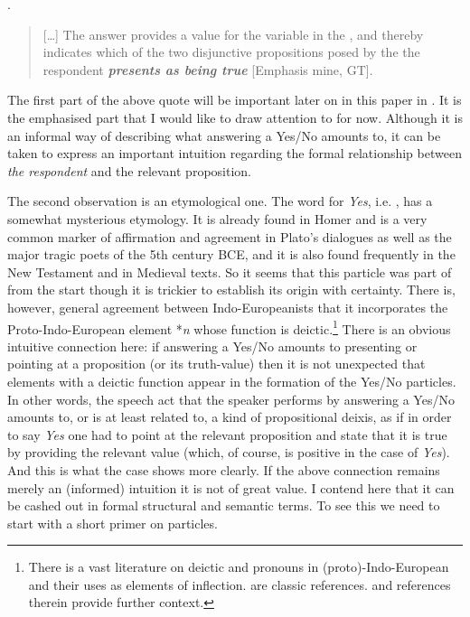 \documentclass[output=paper]{LSP/langsci}
\begin{document}
\Lsciex.
\begin{quote}
  [\ldots] The answer provides a value for the variable in the , and thereby indicates which of the two disjunctive propositions posed by the  the respondent \textit{\textbf{presents as being true}} [Emphasis mine, GT]. 
\end{quote}


The first part of the above quote will be important later on in this paper in .  It is the emphasised part that I would like to draw attention to for now.  Although it is an informal way of describing what answering a Yes/No  amounts to, it can be taken to express an important intuition regarding the formal relationship between \textit{the respondent} and the relevant proposition.

The second observation is an etymological one.  The  word for \textit{Yes}, i.e. \nai, has a somewhat mysterious etymology.  It is already found in Homer and is a very common marker of affirmation and agreement in Plato's dialogues as well as the major tragic poets of the 5th century BCE, and it is also found frequently in the New Testament and in Medieval texts.  So it seems that this particle was part of  from the start though it is trickier to establish its origin with certainty.  There is, however, general agreement between Indo-Europeanists that it incorporates the Proto-Indo-European element *\textit{n}  whose function is deictic.\footnote{There is a vast literature on deictic and  pronouns in (proto)-Indo-European and their uses as elements of inflection.  \citet{brugman:04,brugman:11} are classic references.  \citet{shields:92} and references therein provide further context.}  There is an obvious intuitive connection here: if answering a Yes/No  amounts to presenting or pointing at a proposition (or its truth-value) then it is not unexpected that elements with a deictic function appear in the formation of the Yes/No particles.
In other words, the speech act that the speaker performs by answering a Yes/No  amounts to, or is at least related to, a kind of propositional deixis, as if in order to say \textit{Yes} one had to point at the relevant proposition and state that it is true by providing the relevant  value (which, of course, is positive in the case of \textit{Yes}).  And this is what the  case shows more clearly.  If the above connection remains merely an (informed) intuition it is not of great value.   I contend here that it can be cashed out in formal structural and semantic terms.  To see this we need to start with a short primer on  particles.
\end{document}
